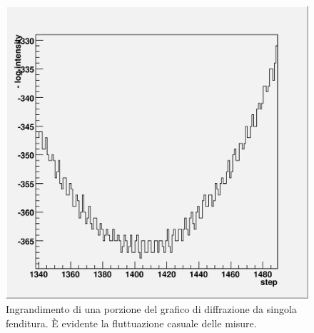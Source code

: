 \documentclass[italian,a4paper]{article}
\begin{document}
\begin{figure}[!h]\centering
\includegraphics[scale=.6]{dentini.eps}
\caption{Ingrandimento di una porzione del grafico di diffrazione da singola fenditura. \`{E} evidente la fluttuazione casuale delle misure.}\label{dentini}
\end{figure}
\end{document}
